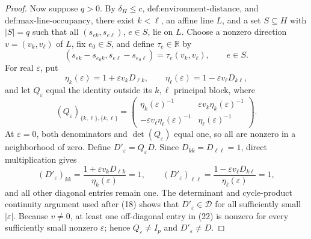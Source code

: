 \documentclass{article}
\begin{document}
\begin{proof}
Now suppose \(q>0\).  By \(\delta_H\le c\), \(\text{def:environment-distance}\), and \(\text{def:max-line-occupancy}\), there exist \(k<\ell\), an affine line \(L\), and a set \(S\subseteq H\) with \(|S|=q\) such that all \((s_{ek},s_{e\ell})\), \(e\in S\), lie on \(L\).  Choose a nonzero direction \(v=(v_k,v_\ell)\) of \(L\), fix \(e_0\in S\), and define \(\tau_e\in\mathbb R\) by
\[
 (s_{ek}-s_{e_0k},s_{e\ell}-s_{e_0\ell})
 =\tau_e(v_k,v_\ell),
 \qquad e\in S.
 \tag{20}
\]
For real \(\varepsilon\), put
\[
 \eta_k(\varepsilon)=1+\varepsilon v_kD_{\ell k},
 \qquad
 \eta_\ell(\varepsilon)=1-\varepsilon v_\ell D_{k\ell},
 \tag{21}
\]
and let \(Q_\varepsilon\) equal the identity outside its \(k,\ell\) principal block, where
\[
 (Q_\varepsilon)_{\{k,\ell\},\{k,\ell\}}
 =\begin{pmatrix}
 \eta_k(\varepsilon)^{-1}&\varepsilon v_k\eta_k(\varepsilon)^{-1}\\
 -\varepsilon v_\ell\eta_\ell(\varepsilon)^{-1}&\eta_\ell(\varepsilon)^{-1}
 \end{pmatrix}.
 \tag{22}
\]
At \(\varepsilon=0\), both denominators and \(\det(Q_\varepsilon)\) equal one, so all are nonzero in a neighborhood of zero.  Define \(D'_{\varepsilon}=Q_\varepsilon D\).  Since \(D_{kk}=D_{\ell\ell}=1\), direct multiplication gives
\[
 (D'_{\varepsilon})_{kk}
 =\frac{1+\varepsilon v_kD_{\ell k}}{\eta_k(\varepsilon)}=1,
 \qquad
 (D'_{\varepsilon})_{\ell\ell}
 =\frac{1-\varepsilon v_\ell D_{k\ell}}{\eta_\ell(\varepsilon)}=1,
 \tag{23}
\]
and all other diagonal entries remain one.  The determinant and cycle-product continuity argument used after (18) shows that \(D'_{\varepsilon}\in\mathcal D\) for all sufficiently small \(|\varepsilon|\).  Because \(v\ne0\), at least one off-diagonal entry in (22) is nonzero for every sufficiently small nonzero \(\varepsilon\); hence \(Q_\varepsilon\ne I_p\) and \(D'_{\varepsilon}\ne D\).


\end{proof}
\end{document}
